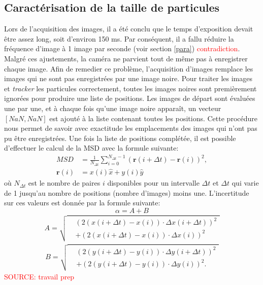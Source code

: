 \documentclass[11pt,letterpaper]{article}
\begin{document}
\subsection{Caractérisation de la taille de particules}
Lors de l'acquisition des images, il a été conclu que le temps d'exposition devait être assez long, soit d'environ 150 ms. Par conséquent, il a fallu réduire 
la fréquence d'image à 1 image par seconde (voir section \ref{para}) \textcolor{red}{contradiction}. Malgré ces ajustements, la caméra ne parvient tout de même
pas à enregistrer chaque image. Afin de remedier ce problème, l'acquisition d'images remplace les images qui ne sont pas enregistrées par une image noire. 
Pour traiter les images et \textit{tracker} les particules correctement, toutes les images noires sont premièrement ignorées pour 
produire une liste de positions. Les images de départ sont évaluées une par une, et à chaque fois qu'une
image noire apparaît, un vecteur $[NaN ,NaN]$ est ajouté à la liste contenant toutes les positions.
Cette procédure nous permet de savoir avec exactitude les emplacements des images qui n'ont pas pu être enregistrées. Une fois la liste de positions 
complétée, il est possible d'effectuer le calcul de la MSD avec la formule suivante: 
 \begin{align}
  MSD &= \frac{1}{N_{\Delta t}} \sum_{i=0}^{N_{\Delta t} - 1} \left( \mathbf{r}(i+\Delta t) - \mathbf{r}(i) \right)^2,\\ 
  \mathbf{r}(i) &= x(i)\hat{x}+ y(i)\hat{y}
\end{align}
où $N_{\Delta t}$ est le nombre de paires $i$ disponibles pour un intervalle $\Delta t$ et $\Delta t$ qui varie de 1 jusqu'au nombre de positions (nombre d'images) moins une. 
L'incertitude sur ces valeurs est donnée par la formule suivante: 
\begin{equation}
  \alpha =A+B
\end{equation}
\begin{align*}
  A = \sqrt{
    \begin{aligned}
      &\left( 2(x(i+\Delta t) - x(i))\cdot \Delta x(i+\Delta t) \right)^2 \\
      &+ \left( 2(x(i+\Delta t) - x(i))\cdot \Delta x(i) \right)^2
    \end{aligned}
  }
\end{align*}
\begin{align*}
  B = \sqrt{
    \begin{aligned}
      &\left( 2(y(i+\Delta t) - y(i))\cdot \Delta y(i+\Delta t) \right)^2 \\
      &+ \left( 2(y(i+\Delta t) - y(i))\cdot \Delta y(i) \right)^2.
    \end{aligned}
  }
\end{align*}
\textcolor{red}{SOURCE: travail prep}
\end{document}
